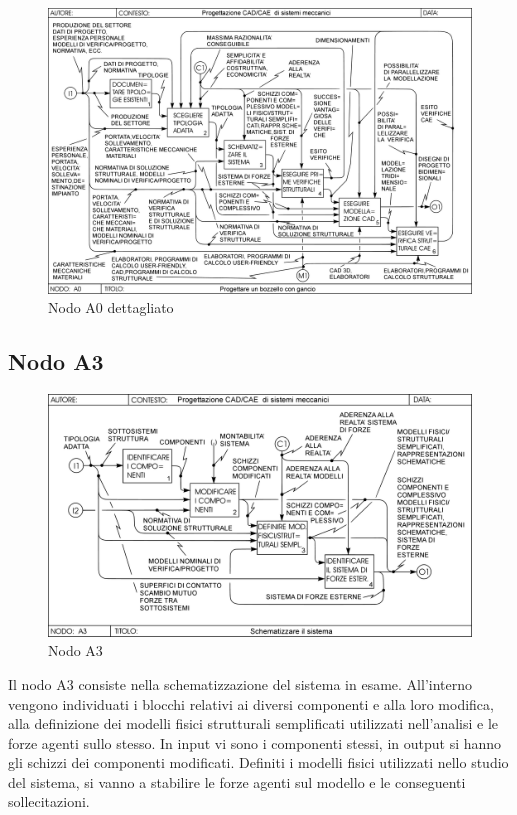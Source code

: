 \begin{figure}[h!]
\centering
  \includegraphics[width=.8\textwidth]{imgs/schedaA0dettaglio.pdf}
\caption{Nodo A0 dettagliato}
\label{fig:schedaA0dettaglio}
\end{figure}

\subsection{Nodo A3}
\begin{figure}[h!]
\centering
  \includegraphics[width=.6\textwidth]{imgs/NodoA3.pdf}
\caption{Nodo A3}
\label{fig:NodoA3}
\end{figure}
Il nodo A3 consiste nella schematizzazione del sistema in esame. All'interno vengono individuati i blocchi relativi ai diversi componenti e alla loro modifica, alla definizione dei modelli fisici strutturali semplificati utilizzati nell'analisi e le forze agenti sullo stesso. In input vi sono i componenti stessi, in output si hanno gli schizzi dei componenti modificati. Definiti i modelli fisici utilizzati nello studio del sistema, si vanno a stabilire le forze agenti sul modello e le conseguenti sollecitazioni. 

